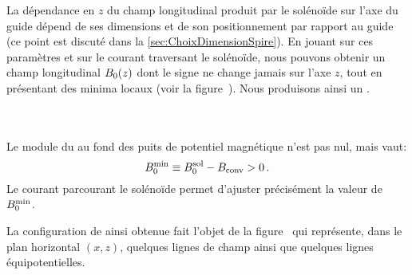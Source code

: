 La dépendance en $z$ du champ longitudinal produit par le solénoïde sur l'axe du guide dépend de ses dimensions et de son positionnement par rapport au guide (ce point est discuté dans la \autoref{sec:ChoixDimensionSpire}). En jouant sur ces paramètres et sur le courant traversant le solénoïde, nous pouvons obtenir un champ longitudinal ${B_0}(z)$ dont le signe ne change jamais sur l'axe $z$, tout en présentant des minima locaux (voir la figure~). Nous produisons ainsi un \tpIP.
\bfighs
{}\\
\RemonteUnPeuFig
{}\\
\RemonteUnPeuFig
{}\\
\label{fig:ConvAnimIPChampLong}
\efigh

\noindent Le module du \chm au fond des puits de potentiel magnétique n'est pas nul, mais vaut:%
%
\begin{equation}
\ConvBparaMin \equiv \ConvBparaSol - \ConvBamplit > 0
\pointformule
	\label{eq:BparaConvMin}
\end{equation}
Le courant parcourant le solénoïde permet d'ajuster précisément la valeur de ${B_{0}^{\rm min}}$. 

\casse

\noindent
La configuration de \chm ainsi obtenue fait l'objet de la figure~ qui représente, dans le plan horizontal $(x,z)$, quelques lignes de champ ainsi que quelques lignes équipotentielles. 

